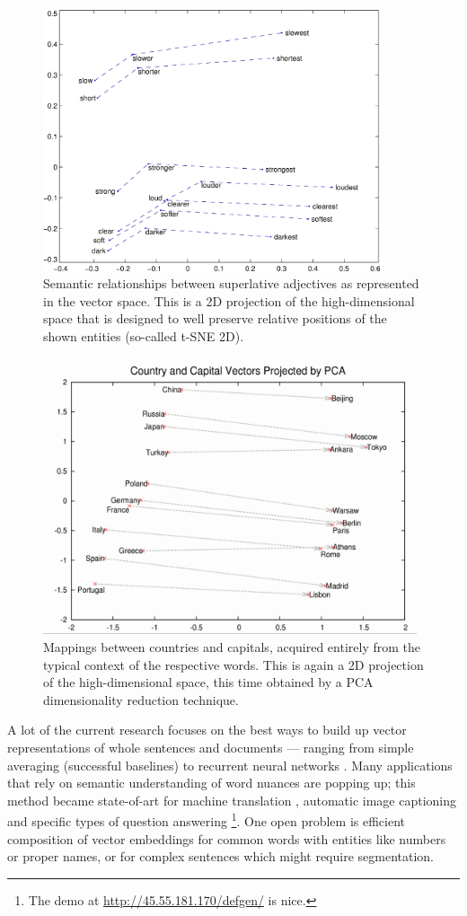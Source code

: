 \begin{figure}[p]
	\centering
	\includegraphics[width=10cm]{comparative_superlative.jpg}
	\caption{Semantic relationships between superlative adjectives as represented in the vector space.
		This is a 2D projection of the high-dimensional space that is designed to well preserve relative positions of the shown entities
		(so-called t-SNE 2D).
		\citep{Glove}}
	\label{fig:w2ver}
\end{figure}

\begin{figure}[p]
	\centering
	\includegraphics[width=11cm]{capitals.png}
	\caption{Mappings between countries and capitals, acquired entirely from the typical context of the respective words.
	This is again a 2D projection of the high-dimensional space, this time obtained by a PCA dimensionality reduction technique.
	\citep{DistReprComp}}
	\label{fig:w2vc}
\end{figure}

A lot of the current research focuses on the best ways to build up
vector representations of whole sentences and documents --- ranging
from simple averaging \citep{CNNSentClass,DefGen} (successful baselines)
to recurrent neural networks \citep{LISA,ShowAndTell}.
Many applications that rely on semantic understanding of word nuances
are popping up; this method became state-of-art for machine translation
\citep{LISA}, automatic image captioning \citep{ShowAndTell} and specific
types of question answering \citep{QANTA,DefGen,ReadAndComprehend}%
\footnote{The demo at \url{http://45.55.181.170/defgen/} is nice.}.
One open problem is efficient composition of vector embeddings for
common words with entities like numbers or proper names,
or for complex sentences which might require segmentation.
